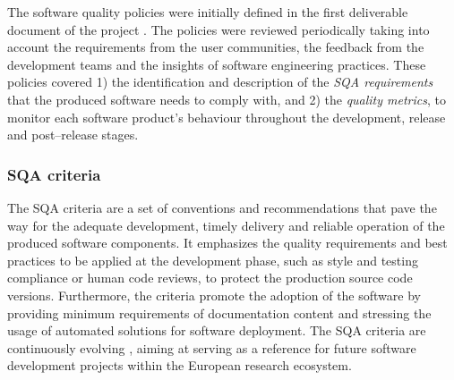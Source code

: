 \documentclass[journal]{IEEEtran}
\begin{document}
The software quality policies were initially defined in the first deliverable document of the
project \cite{indigo-d31}. The policies were reviewed periodically taking into account the requirements
from the user communities, the feedback from the development teams and the insights of software
engineering practices. These policies covered 1) the identification
and description of the \emph{SQA requirements} that the produced software needs
to comply with, and 2) the \emph{quality metrics}, to monitor each software product's
behaviour throughout the development, release and post--release stages.

\subsubsection{SQA criteria}

The SQA criteria are a set of conventions and recommendations that pave the way for
the adequate development, timely delivery and reliable operation of the produced software components.
It emphasizes the quality requirements and best practices to be applied at the
development phase, such as style and testing compliance or human code reviews, to protect the
production source code versions. Furthermore, the criteria promote the adoption of the software
by providing minimum requirements of documentation content and stressing the usage of automated
solutions for software deployment. The SQA criteria are continuously evolving \cite{sqa-baseline}, aiming at serving
as a reference for future software development projects within the European research ecosystem.
\end{document}
